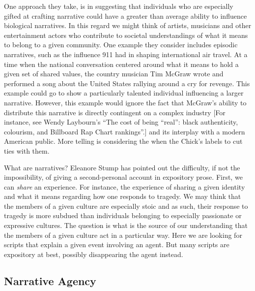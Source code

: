 \documentclass[phdthesis,12pt,final]{wuthesis}
\theoremstyle{definition}
\theoremstyle{definition}
\theoremstyle{definition}
\theoremstyle{definition}
\theoremstyle{remark}
\begin{document}
One approach they take, is in suggesting that individuals who are especially gifted at crafting narrative could have a greater than average ability to influence biological narratives. In this regard we might think of artists, musicians and other entertainment actors who contribute to societal understandings of what it means to belong to a given community. One example they consider includes episodic narratives, such as the influence 911 had in shaping international air travel. At a time when the national conversation centered around what it means to hold a given set of shared values, the country musician Tim McGraw wrote and performed a song about the United States rallying around a cry for revenge. This example could go to show a particularly talented individual influencing a larger narrative. However, this example would ignore the fact that McGraw's ability to distribute this narrative is directly contingent on a complex industry {[}For instance, see Wendy Laybourn's ``The cost of being ``real'': black authenticity, colourism, and Billboard Rap Chart rankings''.{]} and its interplay with a modern American public. More telling is considering the when the Chick's labels to cut ties with them.

What are narratives? Eleanore Stump has pointed out the difficulty, if not the impossibility, of giving a second-personal account in expository prose. First, we can \emph{share} an experience. For instance, the experience of sharing a given identity and what it means regarding how one responds to tragedy. We may think that the members of a given culture are especially stoic and as such, their response to tragedy is more subdued than individuals belonging to especially passionate or expressive cultures. The question is what is the source of our understanding that the members of a given culture act in a particular way. Here we are looking for scripts that explain a given event involving an agent. But many scripts are expository at best, possibly disappearing the agent instead.

\subsection{Narrative Agency}\label{narrative-agency}
\end{document}
